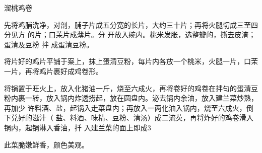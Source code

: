 \begin{recipe}{溜桃鸡卷}

\ingredients



\cooking

先将鸡脯洗净，对剖，脯子片成五分宽的长片，大约三十片；再将火腿切成三至四分见方
的片；口茉片成薄片。分 开放入碗内。桃米发胀，选整瓣的，撕去皮渣；蛋清及豆粉 拌
成蛋清豆粉。

\step 将片好的鸡片平铺于案上，抹上蛋清豆粉，每片内各放一个桃米，火腿一片，口茉
一片，再将鸡片裹好成鸡卷形。

\step 将锅置于旺火上，放入化猪油一斤，烧至六成火，再将卷好的鸡卷在拌匀的蛋清豆
粉内裹一转，放入锅内炸透捞起，放在圆盘内。泌去锅内余油，放入建兰菜炒熟，再加少
许料酒、盐，起锅入走菜盘内；再放入一两化油入锅内，烧至六成火，倒下兑好的滋汁（
盐、料酒、味精、豆粉、清汤）成二流芡，再将炸好的鸡卷滑入锅内，起锅淋入香油，扦
入建兰菜的面上即成3

\notes

此菜脆嫩鲜香，颜色美观。

\end{recipe}

